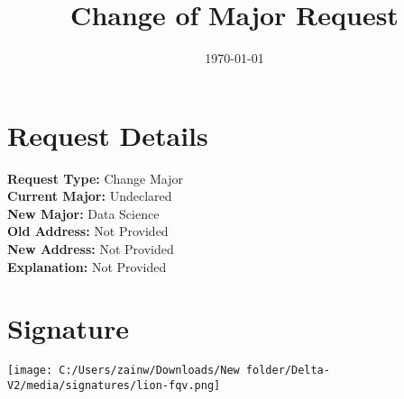 \documentclass{article}
\begin{document}
\title{Change of Major Request}
\date{\today}

\maketitle



\section*{Request Details}
\textbf{Request Type:} Change Major \\
\textbf{Current Major:} Undeclared \\
\textbf{New Major:} Data Science \\
\textbf{Old Address:} Not Provided \\
\textbf{New Address:} Not Provided \\
\textbf{Explanation:} Not Provided

\section*{Signature}
\vspace{1cm}
\texttt{[image: C:/Users/zainw/Downloads/New folder/Delta-V2/media/signatures/lion-fqv.png]} %
\end{document}
